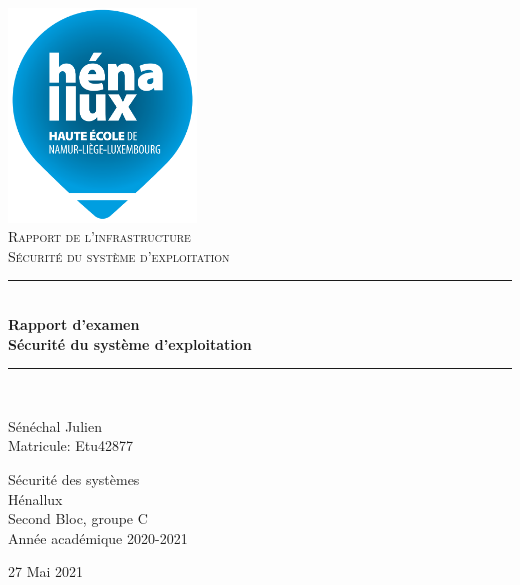 \documentclass[a4paper]{article}
\newcommand{\HRule}{\rule{\linewidth}{0.5mm}}
\newcommand{\bgimg}[1]{
\AddToShipoutPicture
   {
      \put(\LenToUnit{0 cm},\LenToUnit{0 cm})
      {
            \texttt{[image: \#1]} 
      }
   }
}
\begin{document}

















\begin{titlepage}
  \begin{sffamily}
  \begin{center}
    \includegraphics[width=5cm]{images/LogoHenallux.PNG}~\\[1.5cm]
    \textsc{\Large Rapport de l'infrastructure\\ Sécurité du système d'exploitation}\\[1.5cm]
    \HRule \\[0.4cm]
    { \huge \bfseries Rapport d'examen\\Sécurité du système d'exploitation\\[0.4cm] }
    \HRule \\[2cm]
    \begin{minipage}{0.4\textwidth}
      \begin{flushleft} \large
        Sénéchal Julien\\
        Matricule: Etu42877

      \end{flushleft}
    \end{minipage}
    \begin{minipage}{0.55\textwidth}
      \begin{flushright} \large
		Sécurité des systèmes\\
		Hénallux\\
		Second Bloc, groupe C \\
		Année académique 2020-2021\\
      \end{flushright}
    \end{minipage}
    \vfill
    {\large 27 Mai 2021}
  \end{center}
  \end{sffamily}
\end{titlepage}
\end{document}
